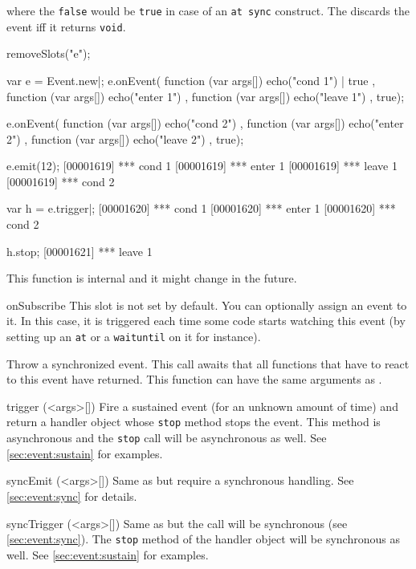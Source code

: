 \begin{urbiscriptapi}
\noindent
where the \lstinline|false| would be \lstinline|true| in case of an
\lstinline|at sync| construct.  The  discards the event iff it
returns \lstinline{void}.

\begin{urbicomment}
removeSlots("e");
\end{urbicomment}
\begin{urbiscript}
var e = Event.new|;
e.onEvent(
  function (var args[]) { echo("cond 1") | true },
  function (var args[]) { echo("enter 1") },
  function (var args[]) { echo("leave 1") },
  true);

e.onEvent(
  function (var args[]) { echo("cond 2") },
  function (var args[]) { echo("enter 2") },
  function (var args[]) { echo("leave 2") },
  true);

e.emit(12);
[00001619] *** cond 1
[00001619] *** enter 1
[00001619] *** leave 1
[00001619] *** cond 2

var h = e.trigger|;
[00001620] *** cond 1
[00001620] *** enter 1
[00001620] *** cond 2

h.stop;
[00001621] *** leave 1
\end{urbiscript}

This function is internal and it might change in the future.

\item[onSubscribe]%
  This slot is not set by default. You can optionally assign an event to
  it. In this case, it is triggered each time some code starts watching this
  event (by setting up an \lstinline|at| or a \lstinline|waituntil| on it
  for instance).

  Throw a synchronized event. This call awaits that all functions that have
  to react to this event have returned.  This function can have the same
  arguments as .

\item[trigger](<args>[])%
  Fire a sustained event (for an unknown amount of time) and return a
  handler object whose \lstinline|stop| method stops the event. This method
  is asynchronous and the \lstinline|stop| call will be asynchronous as
  well.  See \autoref{sec:event:sustain} for examples.

\item[syncEmit](<args>[])%
  Same as  but require a synchronous handling.
  See \autoref{sec:event:sync} for details.

\item[syncTrigger](<args>[])%
  Same as  but the call will be synchronous (see
  \autoref{sec:event:sync}). The \lstinline|stop| method of the handler
  object will be synchronous as well.  See \autoref{sec:event:sustain} for
  examples.


\end{urbiscriptapi}
